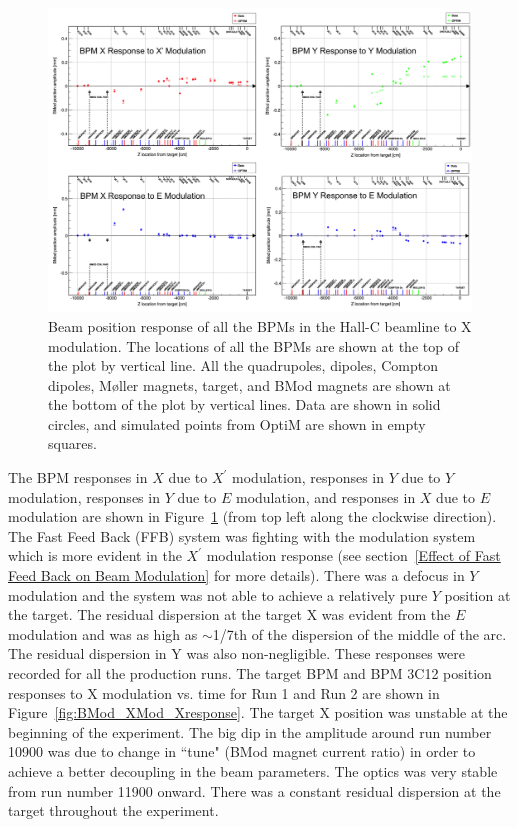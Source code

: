 \begin{singlespace}
\begin{figure}[!h]
	\begin{center}
	\includegraphics[width=15.0cm]{figures/BModOpticsMISC}
	\end{center}
	\caption
	{Beam position response of all the BPMs in the Hall-C beamline to X modulation. The locations of all the BPMs are shown at the top of the plot by vertical line. All the quadrupoles, dipoles, Compton dipoles, M{\o}ller magnets, target, and BMod magnets are shown at the bottom of the plot by vertical lines. Data are shown in solid circles, and simulated points from OptiM are shown in empty squares.}
	\label{fig:BModOpticsMISC}
\end{figure}
\end{singlespace}


The BPM responses in $X$ due to $X^{\prime}$ modulation, responses in $Y$ due to $Y$ modulation, responses in $Y$ due to $E$ modulation, and responses in $X$ due to $E$ modulation are shown in Figure~\ref{fig:BModOpticsMISC} (from top left along the clockwise direction). 
The Fast Feed Back (FFB) system was fighting with the modulation system which is more evident in the $X^{\prime}$ modulation response (see section~\ref{Effect of Fast Feed Back on Beam Modulation} for more details). There was a defocus in $Y$ modulation and the system was not able to achieve a relatively pure $Y$ position at the target. The residual dispersion at the target X was evident from the $E$ modulation and was as high as $\sim$1/7th of the dispersion of the middle of the arc. The residual dispersion in Y was also non-negligible.
These responses were recorded for all the production runs. The target BPM and BPM 3C12 position responses to X modulation vs. time for Run 1 and Run 2 are shown in Figure~\ref{fig:BMod_XMod_Xresponse}. The target X position was unstable at the beginning of the experiment. The big dip in the amplitude around run number 10900 was due to change in ``tune" (BMod magnet current ratio) in order to achieve a better decoupling in the beam parameters. The optics was very stable from run number 11900 onward. There was a constant residual dispersion at the target throughout the experiment.



